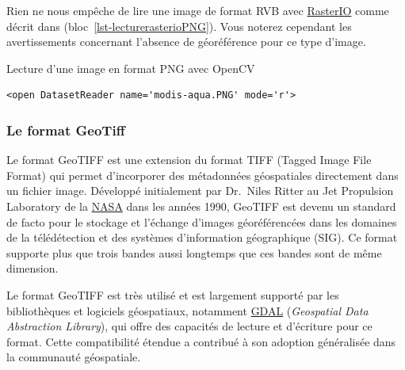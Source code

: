 \documentclass[
  11pt,
  letterpaper,
  open=any,
  twoside=false,
  french]{scrbook}
\newenvironment{Shaded}{\begin{snugshade}}{\end{snugshade}}
\newcommand{\BuiltInTok}[1]{\textcolor[rgb]{0.00,0.23,0.31}{#1}}
\newcommand{\ImportTok}[1]{\textcolor[rgb]{0.00,0.46,0.62}{#1}}
\newcommand{\NormalTok}[1]{\textcolor[rgb]{0.00,0.23,0.31}{#1}}
\newcommand{\OperatorTok}[1]{\textcolor[rgb]{0.37,0.37,0.37}{#1}}
\newcommand{\StringTok}[1]{\textcolor[rgb]{0.13,0.47,0.30}{#1}}
\begin{document}
Rien ne nous empêche de lire une image de format RVB avec
\href{https://rasterio.readthedocs.io/en/stable/}{RasterIO} comme décrit
dans (bloc~\ref{lst-lecturerasterioPNG}). Vous noterez cependant les
avertissements concernant l'absence de géoréférence pour ce type
d'image.

\begin{codelisting}

\caption{\label{lst-lecturerasterioPNG}Lecture d'une image en format PNG
avec OpenCV}

\centering{

\begin{Shaded}
\begin{Highlighting}[]
\ImportTok{import}\NormalTok{ rasterio}
\NormalTok{img}\OperatorTok{=}\NormalTok{ rasterio.}\BuiltInTok{open}\NormalTok{(}\StringTok{\textquotesingle{}modis{-}aqua.PNG\textquotesingle{}}\NormalTok{)}
\NormalTok{img}
\end{Highlighting}
\end{Shaded}

}

\end{codelisting}%

\begin{verbatim}
<open DatasetReader name='modis-aqua.PNG' mode='r'>
\end{verbatim}

\subsubsection{Le format GeoTiff}\label{le-format-geotiff}

Le format GeoTIFF est une extension du format TIFF (Tagged Image File
Format) qui permet d'incorporer des métadonnées géospatiales directement
dans un fichier image. Développé initialement par Dr.~Niles Ritter au
Jet Propulsion Laboratory de la
\href{https://www.earthdata.nasa.gov/esdis/esco/standards-and-practices/geotiff}{NASA}
dans les années 1990, GeoTIFF est devenu un standard de facto pour le
stockage et l'échange d'images géoréférencées dans les domaines de la
télédétection et des systèmes d'information géographique (SIG). Ce
format supporte plus que trois bandes aussi longtemps que ces bandes
sont de même dimension.

Le format GeoTIFF est très utilisé et est largement supporté par les
bibliothèques et logiciels géospatiaux, notamment
\href{https://gdal.org}{GDAL} (\emph{Geospatial Data Abstraction
Library}), qui offre des capacités de lecture et d'écriture pour ce
format. Cette compatibilité étendue a contribué à son adoption
généralisée dans la communauté géospatiale.
\end{document}
